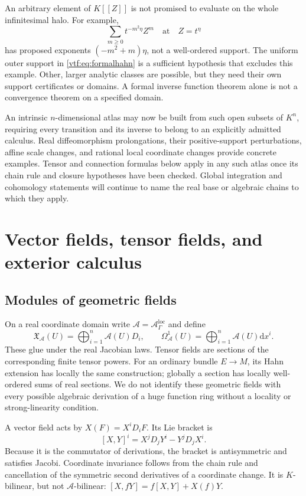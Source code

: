\documentclass[11pt,letterpaper]{article}
\theoremstyle{definition}
\theoremstyle{remark}
\newcommand{\A}{\mathscr A}\newcommand{\OO}{\mathcal O}\newcommand{\mm}{\mathfrak m}
\newcommand{\dd}{\mathrm d}
\begin{document}
An arbitrary element of $K[[Z]]$ is not promised to evaluate on the whole
infinitesimal halo. For example,
\[
 \sum_{m\ge0}t^{-m^2\eta}Z^m
 \quad\text{at}\quad Z=t^\eta
\]
has proposed exponents $(-m^2+m)\eta$, not a well-ordered support.
The uniform outer support in \eqref{vtf:eq:formalhahn} is a sufficient hypothesis
that excludes this example. Other, larger analytic classes are possible,
but they need their own support certificates or domains. A formal inverse
function theorem alone is not a convergence theorem on a specified domain.

An intrinsic $n$-dimensional atlas may now be built from such open subsets of
$K^n$, requiring every transition and its inverse to belong to an explicitly
admitted calculus. Real diffeomorphism prolongations, their positive-support
perturbations, affine scale changes, and rational local coordinate changes
provide concrete examples. Tensor and connection formulas below apply in
any such atlas once its chain rule and closure hypotheses have been checked.
Global integration and cohomology statements will continue to name the real
base or algebraic chains to which they apply.

\section{Vector fields, tensor fields, and exterior calculus}\label{vtf:sec:fields}

\subsection{Modules of geometric fields}

On a real coordinate domain write $\A=\A^{\mathrm{loc}}_\Gamma$ and define
\[
 \mathfrak X_\A(U)=\bigoplus_{i=1}^n\A(U)D_i,
 \qquad
 \Omega^1_\A(U)=\bigoplus_{i=1}^n\A(U)\dd x^i.
\]
These glue under the real Jacobian laws. Tensor fields are sections of the
corresponding finite tensor powers. For an ordinary bundle $E\to M$, its
Hahn extension has locally the same construction; globally a section has
locally well-ordered sums of real sections. We do not identify these
geometric fields with every possible algebraic derivation of a huge function
ring without a locality or strong-linearity condition.

A vector field acts by $X(F)=X^iD_iF$. Its Lie bracket is
\begin{equation}\label{vtf:eq:bracket}
 [X,Y]^i=X^jD_jY^i-Y^jD_jX^i.
\end{equation}
Because it is the commutator of derivations, the bracket is antisymmetric and
satisfies Jacobi. Coordinate invariance follows from the chain rule and
cancellation of the symmetric second derivatives of a coordinate change.
It is $K$-bilinear, but not $\A$-bilinear:
$[X,fY]=f[X,Y]+X(f)Y$.
\end{document}
